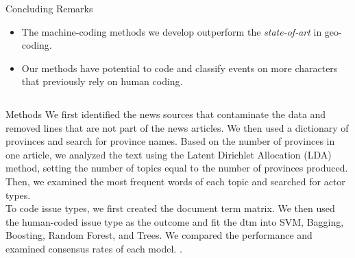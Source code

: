 \documentclass[final]{beamer}
\newlength{\onecolwid}
\newlength{\threecolwid}
\begin{document}
\begin{frame}[t]
\begin{columns}[t]
\begin{column}{\threecolwid}
\begin{columns}[t,totalwidth=\threecolwid]
\begin{column}{\onecolwid}\vspace{-.6in} %


\begin{block}{Concluding Remarks}
\begin{itemize}
\item The machine-coding methods we develop outperform the \textit{state-of-art} in geo-coding. 
\item Our methods have potential to code and classify events on more characters that previously rely on human coding.
\end{itemize}


\end{block}

\end{column}
\end{columns}



\begin{columns}[t,totalwidth=\threecolwid] %

\begin{column}{\onecolwid} %



\begin{block}{Methods}
We first identified the news sources that contaminate the data and removed lines that are not part of the news articles. We then used a dictionary of provinces and search for province names. Based on the number of provinces in one article, we analyzed the text using the Latent Dirichlet Allocation (LDA) method, setting the number of topics equal to the number of provinces produced. Then, we examined the most frequent words of each topic and searched for actor types.\\

To code issue types, we first created the document term matrix. We then used the human-coded issue type as the outcome and fit the dtm into SVM, Bagging, Boosting, Random Forest, and Trees. We compared the performance and examined consensus rates of each model. \cite{jurka2011rtexttools}.



\end{block}
\end{column}
\end{columns}
\end{column}
\end{columns}
\end{frame}
\end{document}
